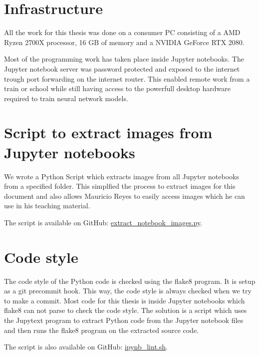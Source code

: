 \section{Infrastructure}
All the work for this thesis was done on a consumer PC consisting of a AMD Ryzen 2700X processor, 16 GB of memory and a NVIDIA GeForce RTX 2080.

Most of the programming work has taken place inside Jupyter notebooks. The Jupyter notebook server was password protected and exposed to the internet trough port forwarding on the internet router. This enabled remote work from a train or school while still having access to the powerfull desktop hardware required to train neural network models.

\section{Script to extract images from Jupyter notebooks}
We wrote a Python Script which extracts images from all Jupyter notebooks from a specified folder. This simplfied the process to extract images for this document and also allows Mauricio Reyes to easily access images which he can use in his teaching material.

The script is available on GitHub: \href{https://github.com/andef4/thesis-code/blob/master/extract_notebook_images.py}{extract\_notebook\_images.py}.

\section{Code style}
The code style of the Python code is checked using the flake8 program. It is setup as a git precommit hook. This way, the code style is always checked when we try to make a commit. Most code for this thesis is inside Jupyter notebooks which flake8 can not parse to check the code style. The solution is a script which uses the Jupytext \cite{jupytext} program to extract Python code from the Jupyter notebook files and then runs the flake8 program on the extracted source code.

The script is also available on GitHub: \href{https://github.com/andef4/thesis-code/blob/master/ipynb_lint.sh}{ipynb\_lint.sh}.
